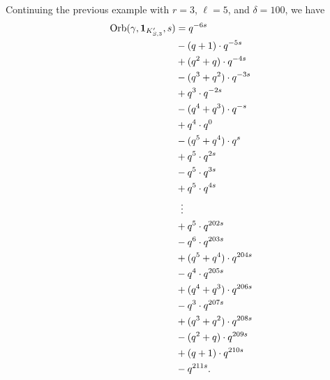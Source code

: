 \begin{example}
  Continuing the previous example with
  $r=3$, $\ell=5$, and $\delta=100$, we have
  \begin{align*}
  \Orb(\gamma, \mathbf{1}_{K'_{S, 3}}, s)
  &= q^{-6s} \\
  &- (q+1) \cdot q^{-5s} \\
  &+ (q^2+q) \cdot q^{-4s} \\
  &- (q^3+q^2) \cdot q^{-3s} \\
  &+ q^3 \cdot q^{-2s} \\
  &- (q^4+q^3) \cdot q^{-s} \\
  &+ q^4 \cdot q^{0} \\
  &- (q^5+q^4) \cdot q^{s} \\
  &+ q^5 \cdot q^{2s} \\
  &- q^5 \cdot q^{3s} \\
  &+ q^5 \cdot q^{4s} \\
  &\vdotswithin= \\
  &+ q^5 \cdot q^{202s} \\
  &- q^6 \cdot q^{203s} \\
  &+ (q^5+q^4) \cdot q^{204s} \\
  &- q^4 \cdot q^{205s} \\
  &+ (q^4+q^3) \cdot q^{206s} \\
  &- q^3 \cdot q^{207s} \\
  &+ (q^3+q^2) \cdot q^{208s} \\
  &- (q^2+q) \cdot q^{209s} \\
  &+ (q+1) \cdot q^{210s} \\
  &- q^{211s}.
  \end{align*}
\end{example}

